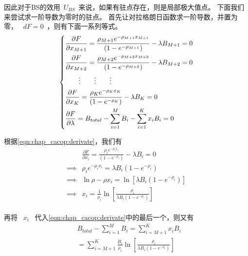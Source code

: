 因此对于BS的效用~$U_{BS}$~来说，如果有驻点存在，则是局部极大值点。
下面我们来尝试求一阶导数为零时的驻点。
首先让对拉格朗日函数求一阶导数，并置为零，
~$dF = 0$~，则有下面一系列等式。
\begin{align} 
\begin{dcases}
\frac{\partial F}{\partial x_{M+1}} =
\frac{\rho_{M+1} e^{-\rho_{M+1} x_{M+1}}}{(1-e^{-\rho_{M+1}})} - \lambda B_{M+1} = 0 \\
\frac{\partial F}{\partial x_{M+2}} =
\frac{\rho_{M+2} e^{-\rho_{M+2} x_{M+2}}}{(1-e^{-\rho_{M+2}})} - \lambda B_{M+2} = 0 \\
\qquad \vdots \qquad \vdots \qquad \vdots \\
\frac{\partial F}{\partial x_K} =
\frac{\rho_K e^{-\rho_K x_K}}{(1-e^{-\rho_K})} - \lambda B_K = 0 \\
\frac{\partial F}{\partial \lambda} = B_{total} - \sum_{i=1}^M B_i -
\sum^K_{i=1}x_iB_i = 0 
\end{dcases}
\label{eqn:chap_cacop:derivate}
\end{align}


根据\eqref{eqn:chap_cacop:derivate}，我们有
\begin{equation*}
\begin{split}
&\frac{\partial F}{\partial x_i} = \frac{\rho_i e^{-\rho_i
x_i}}{(1-e^{-\rho_i})} - \lambda B_i = 0\\
\implies &\rho_i e^{-\rho_i x_i} =\lambda B_i(1-e^{-\rho_i})\\
\implies &\ln\rho - \rho x_i = \ln [\lambda B_i (1-e^{-\rho_i})]\\
\implies &x_i = \frac{1}{\rho_i} \ln \left[ \frac{\rho_i}{\lambda B_i(1-e^{-\rho_i})} \right] \\
\end{split}
\end{equation*}

再将 ~$x_i$~ 代入\eqref{eqn:chap_cacop:derivate}中的最后一个，则又有
%
\begin{equation}
\begin{split}
&B_{total} -\sum_{i=1}^MB_i = \sum_{i=M+1}^K x_i B_i \\
&= \sum_{i=M+1}^K \frac{B_i}{\rho_i} \ln \left[ \frac{\rho_i}{\lambda B_i(1-e^{-\rho_i})} \right] \\
\end{split}
\label{eqn_find_mu}
\end{equation}

